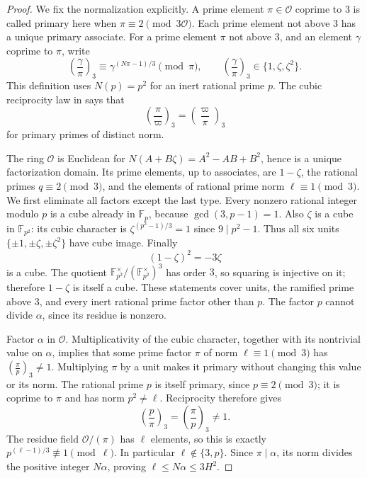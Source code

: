\documentclass[11pt]{article}
\theoremstyle{definition}
\theoremstyle{remark}
\begin{document}
\begin{proof}
We fix the normalization explicitly. A prime element
$\pi\in\mathcal O$ coprime to $3$ is called primary here when
$\pi\equiv2\pmod{3\mathcal O}$.
Each prime element not above $3$ has a unique primary associate.
For a prime element $\pi$ not above $3$, and an element $\gamma$
coprime to $\pi$, write
\[
 \left(\frac{\gamma}{\pi}\right)_3
   \equiv \gamma^{(N\pi-1)/3}\pmod\pi,
 \qquad
 \left(\frac{\gamma}{\pi}\right)_3\in\{1,\zeta,\zeta^2\}.
\]
This definition uses $N(p)=p^2$ for an inert rational prime $p$.
The cubic reciprocity law in
\citet[equation~(1.1), p.~395; the split--inert proof is in
Section~2, pp.~396--397]{FriesenSpearmanWilliams1986}
says that
\[
 \left(\frac{\pi}{\varpi}\right)_3
 =
 \left(\frac{\varpi}{\pi}\right)_3
\]
for primary primes of distinct norm.

The ring $\mathcal O$ is Euclidean for
$N(A+B\zeta)=A^2-AB+B^2$, hence is a unique factorization domain.
Its prime elements, up to associates, are $1-\zeta$, the rational
primes $q\equiv2\pmod3$, and the elements of rational prime norm
$\ell\equiv1\pmod3$.
We first eliminate all factors except the last type.
Every nonzero rational integer modulo $p$ is a cube already in
$\mathbb F_p$, because $\gcd(3,p-1)=1$.
Also $\zeta$ is a cube in $\mathbb F_{p^2}$:
its cubic character is
$\zeta^{(p^2-1)/3}=1$ since $9\mid p^2-1$.
Thus all six units $\{\pm1,\pm\zeta,\pm\zeta^2\}$ have cube image.
Finally
\[
 (1-\zeta)^2=-3\zeta
\]
is a cube. The quotient
$\mathbb F_{p^2}^{\times}/(\mathbb F_{p^2}^{\times})^3$
has order $3$, so squaring is injective on it;
therefore $1-\zeta$ is itself a cube.
These statements cover units, the ramified prime above $3$,
and every inert rational prime factor other than $p$.
The factor $p$ cannot divide $\alpha$, since its residue is nonzero.

Factor $\alpha$ in $\mathcal O$. Multiplicativity of the cubic
character, together with its nontrivial value on $\alpha$, implies
that some prime factor $\pi$ of norm
$\ell\equiv1\pmod3$ has
$\left(\frac{\pi}{p}\right)_3\ne1$.
Multiplying $\pi$ by a unit makes it primary without changing this
value or its norm. The rational prime $p$ is itself primary, since
$p\equiv2\pmod3$; it is coprime to $\pi$ and has norm
$p^2\ne\ell$. Reciprocity therefore gives
\[
 \left(\frac{p}{\pi}\right)_3
 =
 \left(\frac{\pi}{p}\right)_3\ne1.
\]
The residue field $\mathcal O/(\pi)$ has $\ell$ elements, so this is
exactly $p^{(\ell-1)/3}\not\equiv1\pmod\ell$.
In particular $\ell\notin\{3,p\}$.
Since $\pi\mid\alpha$, its norm divides the positive integer
$N\alpha$, proving $\ell\le N\alpha\le3H^2$.


\end{proof}
\end{document}
